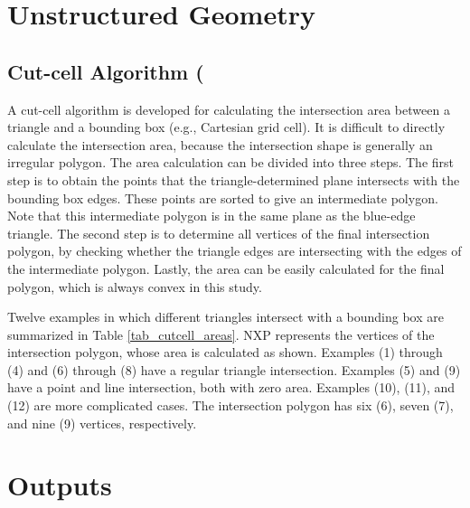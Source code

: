 \documentclass[11pt]{book}
\begin{document}
\newpage

\chapter{Unstructured Geometry}


\section{Cut-cell Algorithm (\texorpdfstring{})}

A cut-cell algorithm is developed for calculating the intersection area between a triangle and a bounding box (e.g., Cartesian grid cell). It is difficult to directly calculate the intersection area, because the intersection shape is generally an irregular polygon. The area calculation can be divided into three steps. The first step is to obtain the points that the triangle-determined plane intersects with the bounding box edges. These points are sorted to give an intermediate polygon. Note that this intermediate polygon is in the same plane as the blue-edge triangle. The second step is to determine all vertices of the final intersection polygon, by checking whether the triangle edges are intersecting with the edges of the intermediate polygon. Lastly, the area can be easily calculated for the final polygon, which is always convex in this study.


 Twelve examples in which different triangles intersect with a bounding box are summarized in Table \ref{tab_cutcell_areas}.  NXP represents the vertices of the intersection polygon, whose area is calculated as shown. Examples (1) through (4) and (6) through (8) have a regular triangle intersection. Examples (5) and (9) have a point and line intersection, both with zero area. Examples (10), (11), and (12) are more complicated cases. The intersection polygon has six (6), seven (7), and nine (9) vertices, respectively.

\newpage

\chapter{Outputs}
\end{document}
